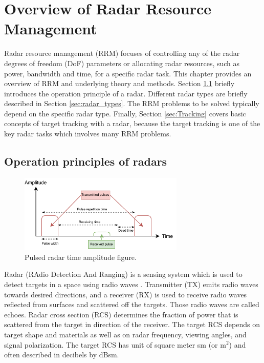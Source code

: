 \documentclass[english, 12pt, a4paper, elec, utf8, a-1b, online]{aaltothesis}
\begin{document}
\clearpage
\section{Overview of Radar Resource Management}\label{sec:background}

Radar resource management (RRM) focuses of controlling any of the radar degrees of freedom (DoF) parameters or allocating radar resources, such as power, bandwidth and time, for a specific radar task.
This chapter provides an overview of RRM and underlying theory and methods.
Section \ref{sec:radar_opertaion_principle} briefly introduces the operation principle of a radar.
Different radar types are briefly described in Section \ref{sec:radar_types}. 
The RRM problems to be solved typically depend on the specific radar type. 
Finally, Section \ref{sec:Tracking} covers basic concepts of target tracking with a radar, because the target tracking is one of the key radar tasks which involves many RRM problems.

\subsection{Operation principles of radars} \label{sec:radar_opertaion_principle}

\begin{figure}[htb]
    \centering
    \includegraphics[width=0.7\textwidth]{figures/background/pulsed_radar.pdf}
    \caption{Pulsed radar time amplitude figure.}
    \label{fig:pulsed_radar}
\end{figure}

Radar (RAdio Detection And Ranging) is a sensing system which is used to detect targets in a space using radio waves \cite{Curry2011}.
Transmitter (TX) emits radio waves towards desired directions, and a receiver (RX) is used to receive radio waves reflected from surfaces and scattered off the targets. 
Those radio waves are called echoes.
Radar cross section (RCS) determines the fraction of power that is scattered from the target in direction of the receiver.
The target RCS depends on target shape and materials as well as on radar frequency, viewing angles, and signal polarization.
The target RCS has unit of square meter sm (or m$^2$) and often described in decibels by dBsm.
\end{document}
